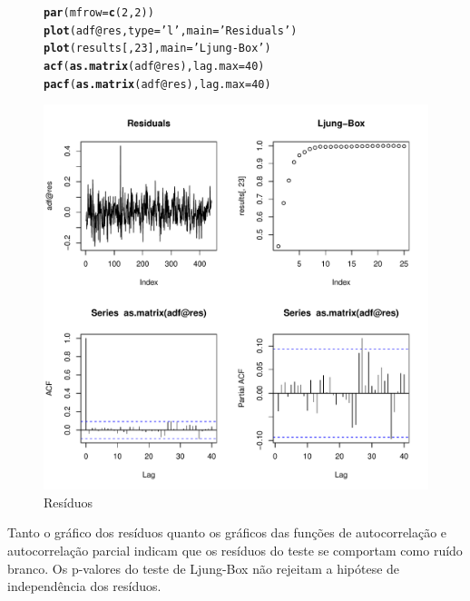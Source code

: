 \documentclass{article}\usepackage[]{graphicx}\usepackage[]{color}
\makeatletter
\def\maxwidth{ %
  \ifdim\Gin@nat@width>\linewidth
    \linewidth
  \else
    \Gin@nat@width
  \fi
}
\newcommand{\hlnum}[1]{\textcolor[rgb]{0.686,0.059,0.569}{#1}}%
\newcommand{\hlstr}[1]{\textcolor[rgb]{0.192,0.494,0.8}{#1}}%
\newcommand{\hlopt}[1]{\textcolor[rgb]{0,0,0}{#1}}%
\newcommand{\hlstd}[1]{\textcolor[rgb]{0.345,0.345,0.345}{#1}}%
\newcommand{\hlkwc}[1]{\textcolor[rgb]{0.333,0.667,0.333}{#1}}%
\newcommand{\hlkwd}[1]{\textcolor[rgb]{0.737,0.353,0.396}{\textbf{#1}}}%
\newenvironment{kframe}{%
 \def\at@end@of@kframe{}%
 \ifinner\ifhmode%
  \def\at@end@of@kframe{\end{minipage}}%
  \begin{minipage}{\columnwidth}%
 \fi\fi%
 \def\FrameCommand##1{\hskip\@totalleftmargin \hskip-\fboxsep
 \colorbox{shadecolor}{##1}\hskip-\fboxsep
     \hskip-\linewidth \hskip-\@totalleftmargin \hskip\columnwidth}%
 \MakeFramed {\advance\hsize-\width
   \@totalleftmargin\z@ \linewidth\hsize
   \@setminipage}}%
 {\par\unskip\endMakeFramed%
 \at@end@of@kframe}
\newenvironment{knitrout}{}{} %
\makeatother
\begin{document}
            \begin{figure}[H]
            \caption{Resíduos}
            \centering
\begin{knitrout}
\color{fgcolor}\begin{kframe}
\begin{alltt}
\hlkwd{par}\hlstd{(}\hlkwc{mfrow} \hlstd{=} \hlkwd{c}\hlstd{(}\hlnum{2}\hlstd{,}\hlnum{2}\hlstd{))}
\hlkwd{plot}\hlstd{(adf}\hlopt{@}\hlkwc{res}\hlstd{,} \hlkwc{type}\hlstd{=}\hlstr{'l'}\hlstd{,} \hlkwc{main}\hlstd{=}\hlstr{'Residuals'}\hlstd{)}
\hlkwd{plot}\hlstd{(results[,}\hlnum{23}\hlstd{],} \hlkwc{main}\hlstd{=}\hlstr{'Ljung-Box'}\hlstd{)}
\hlkwd{acf}\hlstd{(}\hlkwd{as.matrix}\hlstd{(adf}\hlopt{@}\hlkwc{res}\hlstd{),} \hlkwc{lag.max}\hlstd{=}\hlnum{40}\hlstd{)}
\hlkwd{pacf}\hlstd{(}\hlkwd{as.matrix}\hlstd{(adf}\hlopt{@}\hlkwc{res}\hlstd{),} \hlkwc{lag.max}\hlstd{=}\hlnum{40}\hlstd{)}
\end{alltt}
\end{kframe}
\includegraphics[width=\maxwidth]{figure/unnamed-chunk-51-1} 

\end{knitrout}
            \end{figure}

            Tanto o gráfico dos resíduos quanto os gráficos das funções de autocorrelação e autocorrelação parcial indicam que os resíduos do teste se comportam como ruído branco. Os p-valores do teste de Ljung-Box não rejeitam a hipótese de independência dos resíduos.
\end{document}
